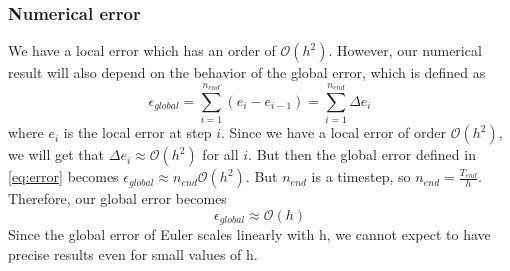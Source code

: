 \documentclass[12pt]{article}
\begin{document}
	 \subsubsection{Numerical error} \label{subsub:err_e}
		We have a local error which has an order of $\mathcal{O}(h^2)$. However, our numerical result will also depend on the behavior of the global error, which is defined as
		\begin{equation} \label{eq:error}
		\epsilon_{global} = \sum_{i=1}^{n_{end}} (e_i - e_{i-1}) = \sum_{i=1}^{n_{end}}  \Delta e_i
		\end{equation}
		where $e_i$ is the local error at step $i$. Since we have a local error of order $\mathcal{O}(h^2)$, we will get that $\Delta e_i \approx \mathcal{O}(h^2)$ for all $i$. But then the global error defined in \ref{eq:error} becomes $\epsilon_{global} \approx n_{end} \mathcal{O}(h^2)$. But $n_{end}$ is a timestep, so $n_{end} = \frac{T_{end}}{h}$. Therefore, our global error becomes
		\begin{equation*}
			\epsilon_{global} \approx \mathcal{O}(h)
		\end{equation*}
		Since the global error of Euler scales linearly with h, we cannot expect to have precise results even for small values of h. 
\end{document}
